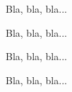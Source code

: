 \docexa{} %

Bla, bla, bla...


Bla, bla, bla...

\docexa*{} %

Bla, bla, bla...

	
Bla, bla, bla...
